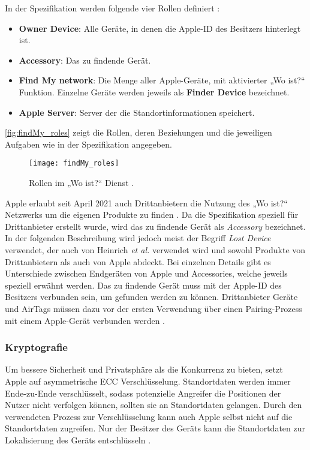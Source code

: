 In der Spezifikation werden folgende vier Rollen definiert \cite{Apple_FindMySpec}:
\begin{itemize}
    \item \textbf{Owner Device}: Alle Geräte, in denen die Apple-ID des Besitzers hinterlegt ist.
    \item \textbf{Accessory}: Das zu findende Gerät.
    \item \textbf{Find My network}: Die Menge aller Apple-Geräte, mit aktivierter „Wo ist?“ Funktion. Einzelne Geräte werden jeweils als \textbf{Finder Device} bezeichnet.
    \item \textbf{Apple Server}: Server der die Standortinformationen speichert.
\end{itemize}
\autoref{fig:findMy_roles} zeigt die Rollen, deren Beziehungen und die jeweiligen Aufgaben wie in der Spezifikation angegeben.
\begin{figure}
    \centering
    \texttt{[image: findMy\_roles]}
    \caption{Rollen im „Wo ist?“ Dienst \cite{Apple_FindMySpec}.}
    \label{fig:findMy_roles}
\end{figure}
Apple erlaubt seit April 2021 auch Drittanbietern die Nutzung des „Wo ist?“ Netzwerks um die eigenen Produkte zu finden \cite{Apple_FindMy3rdParty}.
Da die Spezifikation speziell für Drittanbieter erstellt wurde, wird das zu findende Gerät als \textit{Accessory} bezeichnet.
In der folgenden Beschreibung wird jedoch meist der Begriff \textit{Lost Device} verwendet, der auch von Heinrich \textit{et al.} \cite{Heinrich_FindMy} verwendet wird und sowohl Produkte von Drittanbietern als auch von Apple abdeckt.
Bei einzelnen Details gibt es Unterschiede zwischen Endgeräten von Apple und Accessories, welche jeweils speziell erwähnt werden.
Das zu findende Gerät muss mit der Apple-ID des Besitzers verbunden sein, um gefunden werden zu können.
Drittanbieter Geräte und AirTags müssen dazu vor der ersten Verwendung über einen Pairing-Prozess mit einem Apple-Gerät verbunden werden \cite{Apple_FindMySpec}.

\subsubsection{Kryptografie}
\label{sec:Kryptografie}

Um bessere Sicherheit und Privatsphäre als die Konkurrenz zu bieten, setzt Apple auf asymmetrische \ac{ECC} Verschlüsselung.
Standortdaten werden immer Ende-zu-Ende verschlüsselt, sodass potenzielle Angreifer die Positionen der Nutzer nicht verfolgen können, sollten sie an Standortdaten gelangen.
Durch den verwendeten Prozess zur Verschlüsselung kann auch Apple selbst nicht auf die Standortdaten zugreifen.
Nur der Besitzer des Geräts kann die Standortdaten zur Lokalisierung des Geräts entschlüsseln \cite{Greenberg_FindMyCrypto}.


